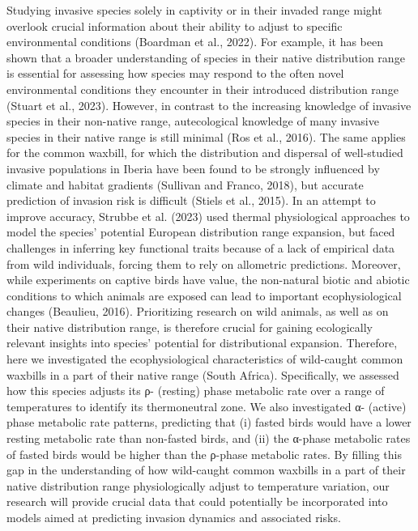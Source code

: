 \documentclass[10pt, twoside]{book} %
\begin{document}
Studying invasive species solely in captivity or in their invaded range might overlook crucial information about their ability to adjust to specific environmental conditions (Boardman et al., 2022). For example, it has been shown that a broader understanding of species in their native distribution range is essential for assessing how species may respond to the often novel environmental conditions they encounter in their introduced distribution range (Stuart et al., 2023). However, in contrast to the increasing knowledge of invasive species in their non-native range, autecological knowledge of many invasive species in their native range is still minimal (Ros et al., 2016). The same applies for the common waxbill, for which the distribution and dispersal of well-studied invasive populations in Iberia have been found to be strongly influenced by climate and habitat gradients (Sullivan and Franco, 2018), but accurate prediction of invasion risk is difficult (Stiels et al., 2015). In an attempt to improve accuracy, Strubbe et al. (2023) used thermal physiological approaches to model the species' potential European distribution range expansion, but faced challenges in inferring key functional traits because of a lack of empirical data from wild individuals, forcing them to rely on allometric predictions. Moreover, while experiments on captive birds have value, the non-natural biotic and abiotic conditions to which animals are exposed can lead to important ecophysiological changes (Beaulieu, 2016). Prioritizing research on wild animals, as well as on their native distribution range, is therefore crucial for gaining ecologically relevant insights into species' potential for distributional expansion. Therefore, here we investigated the ecophysiological characteristics of wild-caught common waxbills in a part of their native range (South Africa). Specifically, we assessed how this species adjusts its ρ- (resting) phase metabolic rate over a range of temperatures to identify its thermoneutral zone. We also investigated α- (active) phase metabolic rate patterns, predicting that (i) fasted birds would have a lower resting metabolic rate than non-fasted birds, and (ii) the α-phase metabolic rates of fasted birds would be higher than the ρ-phase metabolic rates. By filling this gap in the understanding of how wild-caught common waxbills in a part of their native distribution range physiologically adjust to temperature variation, our research will provide crucial data that could potentially be incorporated into models aimed at predicting invasion dynamics and associated risks.\\
\end{document}
